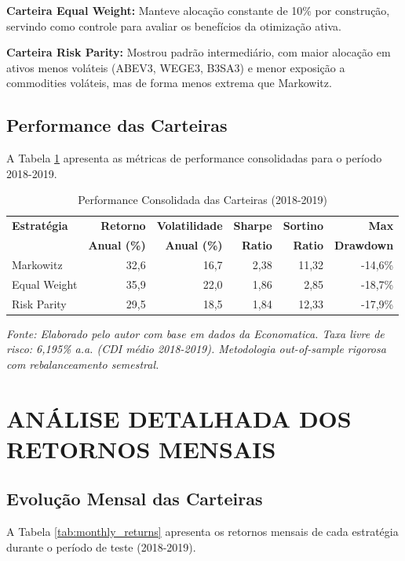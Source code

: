 \textbf{Carteira Equal Weight:} Manteve alocação constante de 10\% por construção, servindo como controle para avaliar os benefícios da otimização ativa.

\textbf{Carteira Risk Parity:} Mostrou padrão intermediário, com maior alocação em ativos menos voláteis (ABEV3, WEGE3, B3SA3) e menor exposição a commodities voláteis, mas de forma menos extrema que Markowitz.

\subsection{Performance das Carteiras}

A Tabela \ref{tab:portfolio_performance} apresenta as métricas de performance consolidadas para o período 2018-2019.

\begin{table}[H]
\centering
\caption{Performance Consolidada das Carteiras (2018-2019)}
\scriptsize
\begin{tabular}{|l|r|r|r|r|r|}
\hline
\textbf{Estratégia} & \textbf{Retorno} & \textbf{Volatilidade} & \textbf{Sharpe} & \textbf{Sortino} & \textbf{Max} \\
& \textbf{Anual (\%)} & \textbf{Anual (\%)} & \textbf{Ratio} & \textbf{Ratio} & \textbf{Drawdown} \\
\hline
Markowitz & 32,6 & 16,7 & 2,38 & 11,32 & -14,6\% \\
\hline
Equal Weight & 35,9 & 22,0 & 1,86 & 2,85 & -18,7\% \\
\hline
Risk Parity & 29,5 & 18,5 & 1,84 & 12,33 & -17,9\% \\
\hline
\end{tabular}
\normalsize

\textit{Fonte: Elaborado pelo autor com base em dados da Economatica. Taxa livre de risco: 6,195\% a.a. (CDI médio 2018-2019). Metodologia out-of-sample rigorosa com rebalanceamento semestral.}
\label{tab:portfolio_performance}
\end{table}

\section{ANÁLISE DETALHADA DOS RETORNOS MENSAIS}

\subsection{Evolução Mensal das Carteiras}

A Tabela \ref{tab:monthly_returns} apresenta os retornos mensais de cada estratégia durante o período de teste (2018-2019).

